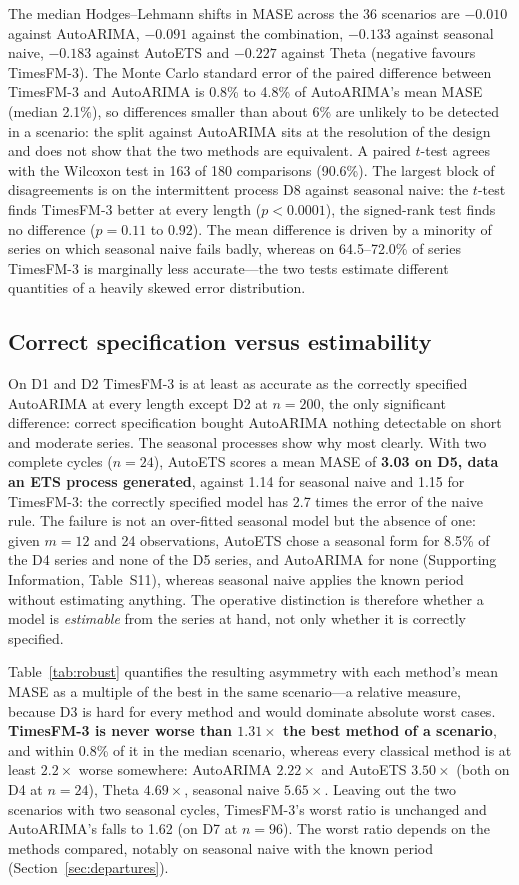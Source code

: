 \documentclass[ASNA]{USG}
\providecommand{\sectionref}[1]{Section~\ref{#1}}
\providecommand{\tableref}[1]{Table~\ref{#1}}
\begin{document}
The median Hodges--Lehmann shifts in MASE across the 36 scenarios are $-0.010$ against AutoARIMA, $-0.091$
against the combination, $-0.133$ against seasonal naive, $-0.183$ against AutoETS and $-0.227$ against
Theta (negative favours TimesFM-3). The Monte Carlo standard error of the paired difference between
TimesFM-3 and AutoARIMA is 0.8\% to 4.8\% of AutoARIMA's mean MASE (median 2.1\%), so differences smaller than
about 6\% are unlikely to be detected in a scenario: the split against AutoARIMA sits at the resolution of the
design and does not show that the two methods are equivalent. A paired $t$-test agrees with the Wilcoxon
test in 163 of 180 comparisons (90.6\%). The largest block of disagreements is on the intermittent process D8
against seasonal naive: the $t$-test finds TimesFM-3 better at every length ($p < 0.0001$), the signed-rank
test finds no difference ($p = 0.11$ to $0.92$). The mean difference is driven by a minority of series on
which seasonal naive fails badly, whereas on 64.5--72.0\% of series TimesFM-3 is marginally less
accurate---the two tests estimate different quantities of a heavily skewed error distribution.

\subsection{Correct specification versus estimability}
\label{sec:estimability}

On D1 and D2 TimesFM-3 is at least as accurate as the correctly specified AutoARIMA at every length except
D2 at $n = 200$, the only significant difference: correct specification bought AutoARIMA nothing
detectable on short and moderate series. The seasonal processes show why most clearly. With two complete
cycles ($n = 24$), AutoETS scores a mean MASE of \textbf{3.03 on D5, data an ETS process generated}, against
1.14 for seasonal naive and 1.15 for TimesFM-3: the correctly specified model has 2.7 times the error of the
naive rule. The failure is not an over-fitted seasonal model but the absence of one: given $m = 12$ and 24
observations, AutoETS chose a seasonal form for 8.5\% of the D4 series and none of the D5 series, and
AutoARIMA for none (Supporting Information, Table~S11), whereas seasonal naive applies the known period
without estimating anything. The operative distinction is therefore whether a model is \emph{estimable}
from the series at hand, not only whether it is correctly specified.

\tableref{tab:robust} quantifies the resulting asymmetry with each method's mean MASE as a multiple of the
best in the same scenario---a relative measure, because D3 is hard for every method and would dominate absolute
worst cases. \textbf{TimesFM-3 is never worse than $1.31\times$ the best method of a scenario}, and within 0.8\% of
it in the median scenario, whereas every classical method is at least $2.2\times$ worse somewhere: AutoARIMA
$2.22\times$ and AutoETS $3.50\times$ (both on D4 at $n = 24$), Theta $4.69\times$, seasonal naive $5.65\times$.
Leaving out the two scenarios with two seasonal cycles, TimesFM-3's worst ratio is unchanged and AutoARIMA's
falls to 1.62 (on D7 at $n = 96$). The worst ratio depends on the methods compared, notably on seasonal naive
with the known period (\sectionref{sec:departures}).
\end{document}
